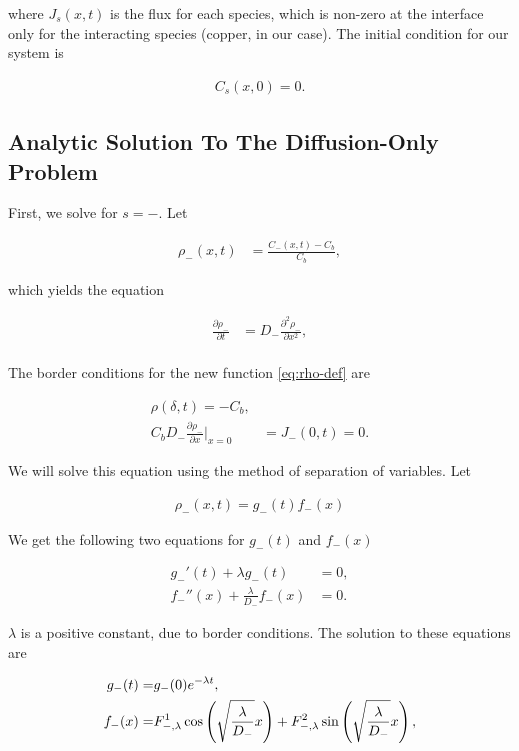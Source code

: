 where $J_s(x,t)$ is the flux for each species, which is non-zero at the interface only for the interacting species (copper, in our case). The initial condition for our system is

\begin{align}
	C_s(x, 0) = 0.
\label{eq:diffusion-bc}
\end{align}



\subsection{Analytic Solution To The Diffusion-Only Problem}

First, we solve for $s=-$. Let 

\begin{align}
	\rho_-(x,t) &= \frac{C_-(x,t) - C_b}{C_b},
	\label{eq:rho-def}
\end{align}

which yields the equation

\begin{align}
\frac{\partial \rho_-}{\partial t} &= D_- \frac{\partial^2 \rho_-}{\partial x^2},\\
\label{eq:diffusion-1d}
\end{align}


The border conditions for the new function \ref{eq:rho-def} are

\begin{align}
	\rho(\delta, t) = -C_b, \\
	C_b D_-\frac{\partial \rho_-}{\partial x}\big|_{x=0} &= J_-(0, t) = 0.
\end{align}


We will solve this equation using the method of separation of variables. Let

\begin{align}
	\rho_-(x,t) = g_-(t)f_-(x)
\end{align}

We get the following two equations for $g_-(t)$ and $f_-(x)$


\begin{align}
	g_-'(t) + \lambda g_-(t) &= 0,\\
	f_-''(x) + \frac{\lambda}{D_-} f_-(x) &= 0.
\end{align}

$\lambda$ is a positive constant, due to border conditions. The solution to these equations are

\begin{align}
	g_-(t) =& g_{-}(0)e^{-\lambda t},\\
	f_-(x) =& F^1_{-,\lambda}\cos\left({{\sqrt{\frac{\lambda}{D_-}} x}}\right) + F^2_{-,\lambda}\sin\left({\sqrt{\frac{\lambda}{D_-}} x}\right),
\end{align}

